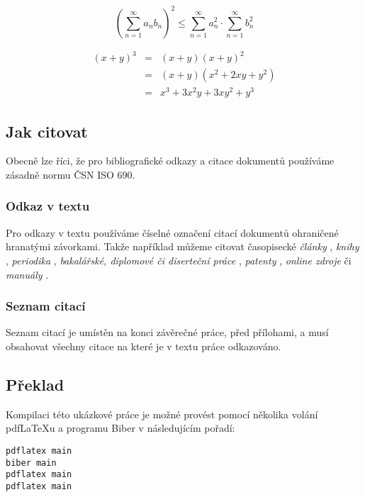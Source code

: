 \documentclass[czech,master,dept460,male,cpp,cpdeclaration]{diploma}
\begin{document}
\begin{equation}
  \left(\sum_{n=1}^{\infty}a_{n}b_{n}\right)^{2} \leq
  \sum_{n=1}^{\infty}a_{n}^{2} \cdot \sum_{n=1}^{\infty}b_{n}^{2}
  \label{eq:A}
\end{equation}

\begin{eqnarray}
  (x+y)^{3} & = & (x+y)(x+y)^{2}\label{eq:B}\\
  & = & (x+y)(x^{2}+2xy+y^{2})\nonumber\\
  & = & x^{3}+3x^{2}y+3xy^{2}+y^{3}\label{eq:C}
\end{eqnarray}
\subsection{Jak citovat}
Obecně lze říci, že pro bibliografické odkazy a citace dokumentů používáme zásadně normu ČSN ISO 690.
\subsubsection{Odkaz v textu}
Pro odkazy v textu používáme číselné označení citací dokumentů ohraničené hranatými závorkami. Takže například můžeme citovat časopisecké \emph{články} \cite{herrmann, bertram, moore, yoon, sigfridsson, baez/article}, \emph{knihy} \cite{wilde, nietzsche:ksa1, averroes/bland, hammond, cotton, knuth:ct:a, gerhardt, gonzalez, companion}, \emph{periodika} \cite{jcg}, \emph{bakalářské, diplomové či diserteční práce} \cite{geer}, \emph{patenty} \cite{kowalik, almendro, sorace, laufenberg}, \emph{online zdroje} \cite{ctan, wassenberg, itzhaki, markey, baez/online} či \emph{manuály} \cite{cms}.

\subsubsection{Seznam citací}
Seznam citací je umístěn na konci závěrečné práce, před přílohami, a musí obsahovat všechny citace na které je v textu práce odkazováno.

\subsection{Překlad}
Kompilaci této ukázkové práce je možné provést pomocí několika volání pdf\LaTeX{}u a programu Biber v následujícím pořadí:
\begin{verbatim}
pdflatex main
biber main
pdflatex main
pdflatex main
\end{verbatim}


\printbibliography[title={Literatura}, heading=bibintoc]


\appendix
\end{document}
